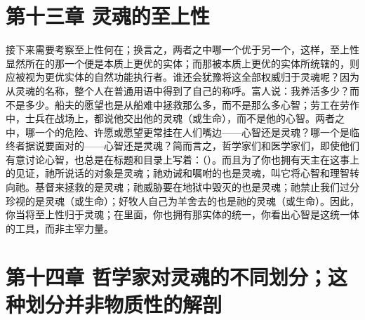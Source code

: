 
\section{第十三章 灵魂的至上性}

接下来需要考察至上性何在；换言之，两者之中哪一个优于另一个，这样，至上性显然所在的那一个便是本质上更优的实体；而那被本质上更优的实体所统辖的，则应被视为更优实体的自然功能执行者。谁还会犹豫将这全部权威归于灵魂呢？因为从灵魂的名称，整个人在普通用语中得到了自己的称呼。富人说：我养活多少？而不是多少。船夫的愿望也是从船难中拯救那么多，而不是那么多心智；劳工在劳作中，士兵在战场上，都说他交出他的灵魂（或生命），而不是他的心智。两者之中，哪一个的危险、许愿或愿望更常挂在人们嘴边——心智还是灵魂？哪一个是临终者据说要面对的——心智还是灵魂？简而言之，哲学家们和医学家们，即使他们有意讨论心智，也总是在标题和目录上写着：（）。而且为了你也拥有天主在这事上的见证，祂所说话的对象是灵魂；祂劝诫和嘱咐的也是灵魂，叫它将心智和理智转向祂。基督来拯救的是灵魂；祂威胁要在地狱中毁灭的也是灵魂；祂禁止我们过分珍视的是灵魂（或生命）；好牧人自己为羊舍去的也是祂的灵魂（或生命）。因此，你当将至上性归于灵魂；在里面，你也拥有那实体的统一，你看出心智是这统一体的工具，而非主宰力量。\par


\section{第十四章 哲学家对灵魂的不同划分；这种划分并非物质性的解剖}

